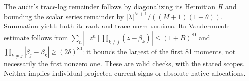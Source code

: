 The audit's trace-log remainder follows by diagonalizing its Hermitian
$H$ and bounding the scalar series remainder by
$|\lambda|^{M+1}/((M+1)(1-\theta))$. Summation yields both its
rank and trace-norm versions. Its Vandermonde estimate follows from
$\sum_n|[z^n]\prod_{k\ne j}(z-\beta_k)|\le(1+B)^{80}$ and
$\prod_{k\ne j}|\beta_j-\beta_k|\ge(2\delta)^{80}$; it bounds
the largest of the first 81 moments, not necessarily the first nonzero
one. These are valid checks, with the stated scopes. Neither implies
individual projected-current signs or absolute native allocations.
